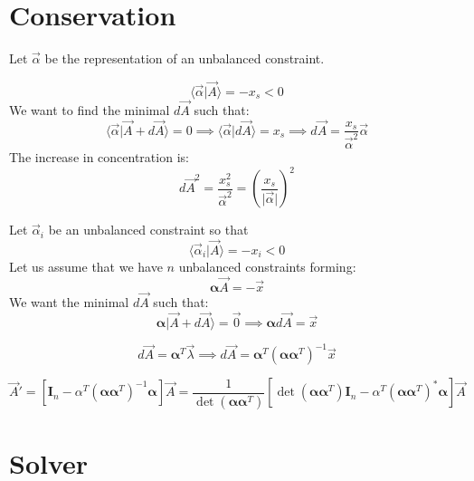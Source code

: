 \documentclass[aps,12pt]{revtex4}
\begin{document}
\section{Conservation}

Let $\vec \alpha$ be the representation of an unbalanced constraint.

\begin{equation}
	\langle \vec \alpha \vert \vec A \rangle = - x_s < 0
\end{equation}
We want to find the minimal $d \vec A$ such that:
\begin{equation}
	\langle \vec \alpha \vert \vec A + d\vec A \rangle = 0 \implies \langle \vec \alpha \vert d \vec A \rangle = x_s \implies d \vec A = \dfrac{x_s}{\vec\alpha^2} \vec \alpha
\end{equation}
The increase in concentration is:
\begin{equation}
	d \vec A^2 = \dfrac{x_s^2}{\vec \alpha^2} = \left( \dfrac{x_s}{\vert\vec\alpha\vert}\right) ^2
\end{equation}

Let $\vec \alpha_i$ be an unbalanced constraint so that
\begin{equation}
	\langle \vec \alpha_i \vert \vec A \rangle = - x_i < 0
\end{equation}
Let us assume that we have $n$ unbalanced constraints forming:
\begin{equation}
	\bm \alpha \vec A = - \vec x
\end{equation}
We want the minimal $d \vec A$ such that:
\begin{equation}
	\bm \alpha \vert \vec A + d \vec A \rangle = \vec 0 \implies \bm \alpha d\vec A = \vec x
\end{equation}

\begin{equation}
	d \vec A = \bm \alpha ^ T \vec \lambda \implies d \vec A = \bm \alpha^T \left(\bm \alpha \bm \alpha ^T \right) ^{-1}\vec x 
\end{equation}

\begin{equation}
	\vec{A} ' = \left[\bm I_n - \alpha^T \left(\bm \alpha \bm \alpha ^T \right)^{-1} \bm \alpha \right] \vec{A} 
	= \dfrac{1}{\det \left(\bm \alpha \bm \alpha ^T\right) } \left[\det \left(\bm \alpha \bm \alpha ^T\right)\bm I_n - \alpha^T \left(\bm \alpha \bm \alpha ^T \right)^\ast \bm \alpha \right] \vec{A}
\end{equation}
 	
\section{Solver}
\end{document}
